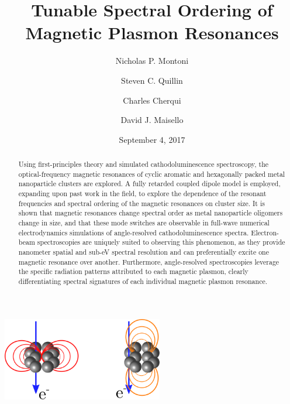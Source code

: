 \documentclass[journal=apchd5,manuscript=article]{achemso}
\author{Nicholas P. Montoni}
\author{Steven C. Quillin}
\author{Charles Cherqui}
\author{David J. Maisello}
\affiliation[Department of Chemistry, University of Washington]
{Department of Chemistry, University of Washington, Seattle, WA 98195}
\date{September 4, 2017}
\title[]
    {Tunable Spectral Ordering of Magnetic Plasmon Resonances}
\begin{document}
\begin{tocentry}
\begin{centering}
\includegraphics[width=7cm]{toc.png}
\end{centering}
\end{tocentry}

\begin{abstract}
Using first-principles theory and simulated cathodoluminescence spectroscopy, the optical-frequency magnetic resonances of cyclic aromatic and hexagonally packed metal nanoparticle clusters are explored. A fully retarded coupled dipole model is employed, expanding upon past work in the field, to explore the dependence of the resonant frequencies and spectral ordering of the magnetic resonances on cluster size. It is shown that magnetic resonances change spectral order as metal nanoparticle oligomers change in size, and that these mode switches are observable in full-wave numerical electrodynamics simulations of angle-resolved cathodoluminescence spectra. Electron-beam spectroscopies are uniquely suited to observing this phenomenon, as they provide nanometer spatial and sub-eV spectral resolution and can preferentially excite one magnetic resonance over another. Furthermore, angle-resolved spectroscopies leverage the specific radiation patterns attributed to each magnetic plasmon, clearly differentiating spectral signatures of each individual magnetic plasmon resonance.
\end{abstract}
\end{document}
